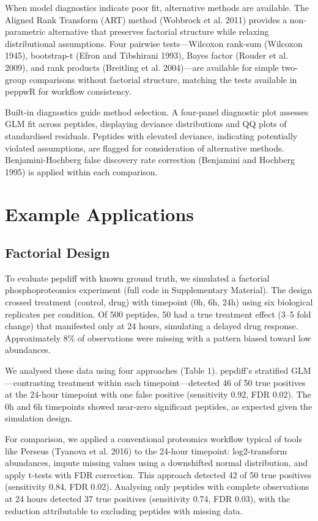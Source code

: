 \documentclass[
]{article}
\begin{document}
When model diagnostics indicate poor fit, alternative methods are
available. The Aligned Rank Transform (ART) method (Wobbrock et al.
2011) provides a non-parametric alternative that preserves factorial
structure while relaxing distributional assumptions. Four pairwise
tests---Wilcoxon rank-sum (Wilcoxon 1945), bootstrap-t (Efron and
Tibshirani 1993), Bayes factor (Rouder et al. 2009), and rank products
(Breitling et al. 2004)---are available for simple two-group comparisons
without factorial structure, matching the tests available in peppwR for
workflow consistency.

Built-in diagnostics guide method selection. A four-panel diagnostic
plot assesses GLM fit across peptides, displaying deviance distributions
and QQ plots of standardised residuals. Peptides with elevated deviance,
indicating potentially violated assumptions, are flagged for
consideration of alternative methods. Benjamini-Hochberg false discovery
rate correction (Benjamini and Hochberg 1995) is applied within each
comparison.

\section{Example Applications}\label{example-applications}

\subsection{Factorial Design}\label{factorial-design}

To evaluate pepdiff with known ground truth, we simulated a factorial
phosphoproteomics experiment (full code in Supplementary Material). The
design crossed treatment (control, drug) with timepoint (0h, 6h, 24h)
using six biological replicates per condition. Of 500 peptides, 50 had a
true treatment effect (3--5 fold change) that manifested only at 24
hours, simulating a delayed drug response. Approximately 8\% of
observations were missing with a pattern biased toward low abundances.

We analysed these data using four approaches (Table 1). pepdiff's
stratified GLM---contrasting treatment within each timepoint---detected
46 of 50 true positives at the 24-hour timepoint with one false positive
(sensitivity 0.92, FDR 0.02). The 0h and 6h timepoints showed near-zero
significant peptides, as expected given the simulation design.

For comparison, we applied a conventional proteomics workflow typical of
tools like Perseus (Tyanova et al. 2016) to the 24-hour timepoint:
log2-transform abundances, impute missing values using a downshifted
normal distribution, and apply t-tests with FDR correction. This
approach detected 42 of 50 true positives (sensitivity 0.84, FDR 0.02).
Analysing only peptides with complete observations at 24 hours detected
37 true positives (sensitivity 0.74, FDR 0.03), with the reduction
attributable to excluding peptides with missing data.
\end{document}
